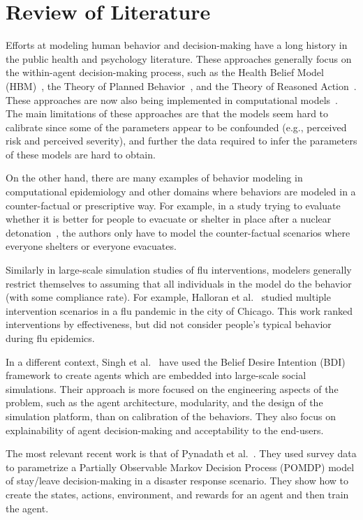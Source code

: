 \documentclass[doublespace,draft]{VTthesis}
\begin{document}
	\chapter{Review of Literature} \label{ch:lit_review}
	Efforts at modeling human behavior and decision-making have a long history in the public health and psychology literature. These approaches generally focus on the within-agent decision-making process, such as the Health Belief Model (HBM)~\cite{rosenstock66hbm}, the Theory of Planned Behavior~\cite{ajzen91tpb}, and the Theory of Reasoned Action~\cite{ajzen80understanding}. These approaches are now also being implemented in computational models~\cite{Durham2012H1N1,orr13health}. The main limitations of these approaches are that the models seem hard to calibrate since some of the parameters appear to be confounded (e.g., perceived risk and perceived severity), and further the data required to infer the parameters of these models are hard to obtain. 

    On the other hand, there are many examples of behavior modeling in computational epidemiology and other domains where behaviors are modeled in a counter-factual or prescriptive way. For example, in a study trying to evaluate whether it is better for people to evacuate or shelter in place after a nuclear detonation~\cite{wein10nuclear,parikh16jaamas}, the authors only have to model the counter-factual scenarios where everyone shelters or everyone evacuates.
    
    Similarly in large-scale simulation studies of flu interventions, modelers generally restrict themselves to assuming that all individuals in the model do the behavior (with some compliance rate). For example, Halloran et al.~\cite{halloran08modeling} studied multiple intervention scenarios in a flu pandemic in the city of Chicago. This work ranked interventions by effectiveness, but did not consider  people's typical behavior during flu epidemics.
    
    In a different context, Singh et al.~\cite{singh16bdi} have used the Belief Desire Intention (BDI) framework to create agents which are embedded into large-scale social simulations. Their approach is more focused on the engineering aspects of the problem, such as the agent architecture, modularity, and the design of the simulation platform, than on calibration of the behaviors. They also focus on explainability of agent decision-making and acceptability to the end-users.
    
    The most relevant recent work is that of Pynadath et al.~\cite{pynadath16behavior}. They used survey data to parametrize a Partially Observable Markov Decision Process (POMDP) model of stay/leave decision-making in a disaster response scenario. They show how to create the states, actions, environment, and rewards for an agent and then train the agent.
    
\end{document}

